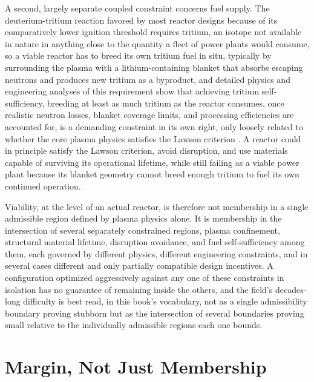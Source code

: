 \documentclass[11pt]{book}
\begin{document}
A second, largely separate coupled constraint concerns fuel supply. The deuterium-tritium reaction favored by most reactor designs because of its comparatively lower ignition threshold requires tritium, an isotope not available in nature in anything close to the quantity a fleet of power plants would consume, so a viable reactor has to breed its own tritium fuel in situ, typically by surrounding the plasma with a lithium-containing blanket that absorbs escaping neutrons and produces new tritium as a byproduct, and detailed physics and engineering analyses of this requirement show that achieving tritium self-sufficiency, breeding at least as much tritium as the reactor consumes, once realistic neutron losses, blanket coverage limits, and processing efficiencies are accounted for, is a demanding constraint in its own right, only loosely related to whether the core plasma physics satisfies the Lawson criterion \cite{abdou2021}. A reactor could in principle satisfy the Lawson criterion, avoid disruption, and use materials capable of surviving its operational lifetime, while still failing as a viable power plant because its blanket geometry cannot breed enough tritium to fuel its own continued operation.

Viability, at the level of an actual reactor, is therefore not membership in a single admissible region defined by plasma physics alone. It is membership in the intersection of several separately constrained regions, plasma confinement, structural material lifetime, disruption avoidance, and fuel self-sufficiency among them, each governed by different physics, different engineering constraints, and in several cases different and only partially compatible design incentives. A configuration optimized aggressively against any one of these constraints in isolation has no guarantee of remaining inside the others, and the field's decades-long difficulty is best read, in this book's vocabulary, not as a single admissibility boundary proving stubborn but as the intersection of several boundaries proving small relative to the individually admissible regions each one bounds.

\section{Margin, Not Just Membership}
\end{document}
